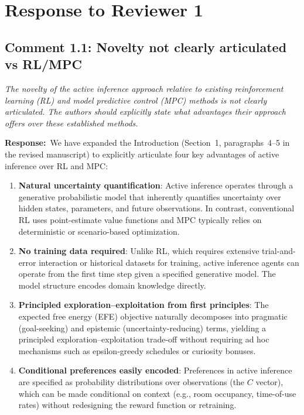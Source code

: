 \documentclass[11pt]{article}
\newcommand{\reviewercomment}[1]{\textit{#1}}
\newcommand{\response}{\textbf{Response:}\ }
\begin{document}
\section*{Response to Reviewer 1}

\subsection*{Comment 1.1: Novelty not clearly articulated vs RL/MPC}

\reviewercomment{The novelty of the active inference approach relative to existing reinforcement learning (RL) and model predictive control (MPC) methods is not clearly articulated. The authors should explicitly state what advantages their approach offers over these established methods.}

\response We have expanded the Introduction (Section~1, paragraphs~4--5 in the revised manuscript) to explicitly articulate four key advantages of active inference over RL and MPC:

\begin{enumerate}[label=(\alph*)]
    \item \textbf{Natural uncertainty quantification}: Active inference operates through a generative probabilistic model that inherently quantifies uncertainty over hidden states, parameters, and future observations. In contrast, conventional RL uses point-estimate value functions and MPC typically relies on deterministic or scenario-based optimization.
    \item \textbf{No training data required}: Unlike RL, which requires extensive trial-and-error interaction or historical datasets for training, active inference agents can operate from the first time step given a specified generative model. The model structure encodes domain knowledge directly.
    \item \textbf{Principled exploration--exploitation from first principles}: The expected free energy (EFE) objective naturally decomposes into pragmatic (goal-seeking) and epistemic (uncertainty-reducing) terms, yielding a principled exploration--exploitation trade-off without requiring ad hoc mechanisms such as epsilon-greedy schedules or curiosity bonuses.
    \item \textbf{Conditional preferences easily encoded}: Preferences in active inference are specified as probability distributions over observations (the $C$ vector), which can be made conditional on context (e.g., room occupancy, time-of-use rates) without redesigning the reward function or retraining.
\end{enumerate}
\end{document}
